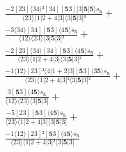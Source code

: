 \documentclass[varwidth, border=5pt]{standalone}
\begin{document}
\begin{my}
$\begin{gathered}
\scriptscriptstyle\frac{-2[23]⟨34⟩²[34][𝟓3][3|𝟓|𝟓⟩s_{𝟓}}{⟨23⟩⟨1|2+4|3]⟨3|𝟓|3]³} +\\
\scriptscriptstyle\frac{-3⟨34⟩[34][𝟓3]⟨4𝟓⟩s_{𝟓}}{⟨12⟩⟨23⟩⟨3|𝟓|3]²} +\\
\scriptscriptstyle\frac{-2[23]⟨34⟩[34][𝟓3]⟨4𝟓⟩s_{𝟓}}{⟨23⟩⟨1|2+4|3]⟨3|𝟓|3]²} +\\
\scriptscriptstyle\frac{-1⟨12⟩[23]²⟨4|1+2|3][𝟓3]⟨3𝟓⟩s_{𝟓}}{⟨23⟩⟨1|2+4|3]²⟨3|𝟓|3]²} +\\
\scriptscriptstyle\frac{3[𝟓3]⟨4𝟓⟩s_{𝟓}}{⟨12⟩⟨23⟩⟨3|𝟓|3]} +\\
\scriptscriptstyle\frac{-5[23][𝟓3]⟨4𝟓⟩s_{𝟓}}{⟨23⟩⟨1|2+4|3]⟨3|𝟓|3]} +\\
\scriptscriptstyle\frac{-1⟨12⟩[23]²[𝟓3]⟨4𝟓⟩s_{𝟓}}{⟨23⟩⟨1|2+4|3]²⟨3|𝟓|3]} \phantom{+}
\end{gathered}$
\end{my}
\end{document}
